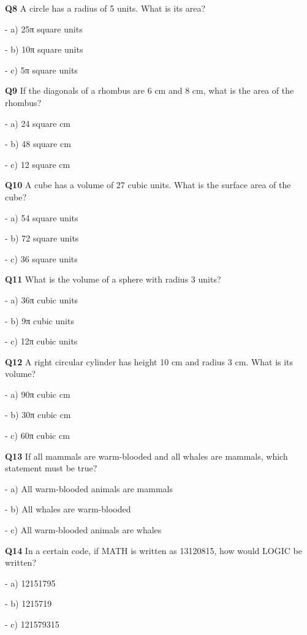 \textbf{Q8} A circle has a radius of 5 units. What is its area?\par
\quad - a) 25π square units\par
\quad - b) 10π square units\par
\quad - c) 5π square units\par

\textbf{Q9} If the diagonals of a rhombus are 6 cm and 8 cm, what is the area of the rhombus?\par
\quad - a) 24 square cm\par
\quad - b) 48 square cm\par
\quad - c) 12 square cm\par

\textbf{Q10} A cube has a volume of 27 cubic units. What is the surface area of the cube?\par
\quad - a) 54 square units\par
\quad - b) 72 square units\par
\quad - c) 36 square units\par

\textbf{Q11} What is the volume of a sphere with radius 3 units?\par
\quad - a) 36π cubic units\par
\quad - b) 9π cubic units\par
\quad - c) 12π cubic units\par

\textbf{Q12} A right circular cylinder has height 10 cm and radius 3 cm. What is its volume?\par
\quad - a) 90π cubic cm\par
\quad - b) 30π cubic cm\par
\quad - c) 60π cubic cm\par

\textbf{Q13} If all mammals are warm-blooded and all whales are mammals, which statement must be true?\par
\quad - a) All warm-blooded animals are mammals\par
\quad - b) All whales are warm-blooded\par
\quad - c) All warm-blooded animals are whales\par

\textbf{Q14} In a certain code, if MATH is written as 13120815, how would LOGIC be written?\par
\quad - a) 12151795\par
\quad - b) 1215719\par
\quad - c) 121579315\par

